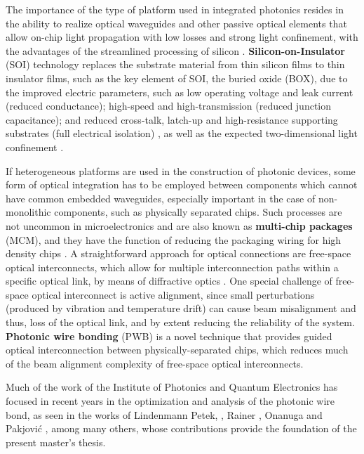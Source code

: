 The importance of the type of platform used in integrated photonics resides in the ability to realize optical waveguides and other passive optical elements that allow on-chip light propagation with low losses and strong light confinement, with the advantages of the streamlined processing of silicon \cite{ReedSOI92}. \textbf{Silicon-on-Insulator} (SOI) technology replaces the substrate material from thin silicon films to thin insulator films, such as the key element of SOI, the buried oxide (BOX), due to the improved electric parameters, such as low operating voltage and leak current (reduced conductance); high-speed and high-transmission (reduced junction capacitance); and reduced cross-talk, latch-up and high-resistance supporting substrates (full electrical isolation) \cite{FukudaSOI01}, as well as the expected two-dimensional light confinement \cite{SiPhReed04}.
\par \medskip
If heterogeneous platforms are used in the construction of photonic devices, some form of optical integration has to be employed between components which cannot have common embedded waveguides, especially important in the case of non-monolithic components, such as physically separated chips. Such processes are not uncommon in microelectronics and are also known as \textbf{multi-chip packages} (MCM), and they have the function of reducing the packaging wiring for high density chips \cite{PolyWong13}. A straightforward approach for optical connections are free-space optical interconnects, which allow for multiple interconnection paths within a specific optical link, by means of diffractive optics \cite{SiPhPavesi16}. One special challenge of free-space optical interconnect is active alignment, since small perturbations (produced by vibration and temperature drift) can cause beam misalignment and thus, loss of the optical link, and by extent reducing the reliability of the system. \textbf{Photonic wire bonding} (PWB) is a novel technique that provides guided optical interconnection between physically-separated chips, which reduces much of the beam alignment complexity of free-space optical interconnects. 
\par \medskip
Much of the work of the Institute of Photonics and Quantum Electronics has focused in recent years in the optimization and analysis of the photonic wire bond, as seen in the works of Lindenmann \cite{LindenmannPWB12} Petek, \cite{IntPWBPetek16}, Rainer \cite{MMIRainer16}, Onanuga \cite{TapWGOnanuga14} and Pakjović \cite{SOHPajkovic16}, among many others, whose contributions provide the foundation of the present master's thesis. 
